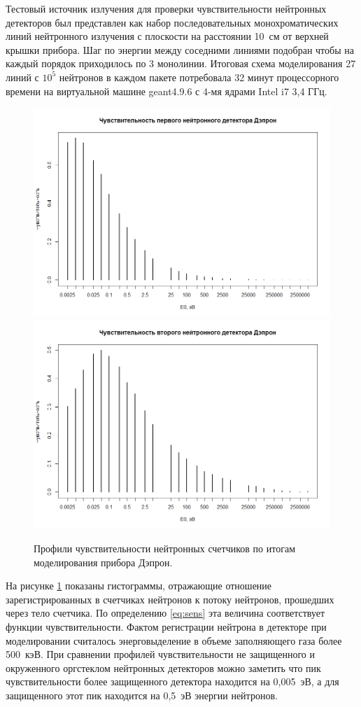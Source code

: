 Тестовый источник излучения для проверки чувствительности нейтронных детекторов был представлен как набор последовательных монохроматических линий нейтронного излучения с плоскости на расстоянии 10~см от верхней крышки прибора. Шаг по энергии между соседними линиями подобран чтобы на каждый порядок приходилось по 3 монолинии.  
Итоговая схема моделирования 27 линий с $ 10^5 $ нейтронов в каждом пакете потребовала 32 минут процессорного времени на виртуальной машине geant4.9.6 с 4-мя ядрами Intel i7 3,4 ГГц.
\begin{figure}
	\centering
	\includegraphics[width=0.6\linewidth]{images/neutrons/nsens1}
	\includegraphics[width=0.6\linewidth]{images/neutrons/nsens2}
	\caption{Профили чувствительности нейтронных счетчиков по итогам моделирования прибора Дэпрон. }
	\label{fig:nsens1}
\end{figure}
На рисунке \ref{fig:nsens1} показаны гистограммы, отражающие отношение зарегистрированных в счетчиках нейтронов к потоку нейтронов, прошедших через тело счетчика. По определению \ref{eq:sens} эта величина соответствует функции чувствительности. Фактом регистрации нейтрона в детекторе при моделировании считалось энерговыделение в объеме заполняющего газа более 500~кэВ. При сравнении профилей чувствительности не защищенного и окруженного оргстеклом нейтронных детекторов можно заметить что пик чувствительности более защищенного детектора находится на 0,005~эВ, а для защищенного этот пик находится на 0,5~эВ энергии нейтронов.


